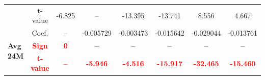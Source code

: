 \documentclass[11pt,english,a4paper,hidelinks]{book}
\begin{document}
\begin{table}[H]
\begin{tabular}{lccccccc}
            & t-value & -6.825    & --        & -13.395   & -13.741   & 8.556     & 4.667     \\
        \cmidrule{1-8}
        \multirow{3}{*}{\textbf{Avg 24M}}
            & Coef.   & --        & -0.005729 & -0.003473 & -0.015642 & -0.029044 & -0.013761 \\
            & \textbf{\textcolor{red}{Sign}}    & \textbf{\textcolor{red}{0}}         & \textbf{\textcolor{red}{–}}         & \textbf{\textcolor{red}{–}}         & \textbf{\textcolor{red}{–}}         & \textbf{\textcolor{red}{–}}         & \textbf{\textcolor{red}{–}}         \\
            & \textbf{\textcolor{red}{t-value}} & \textbf{\textcolor{red}{--}}        & \textbf{\textcolor{red}{-5.946}}    & \textbf{\textcolor{red}{-4.516}}    & \textbf{\textcolor{red}{-15.917}}   & \textbf{\textcolor{red}{-32.465}}   & \textbf{\textcolor{red}{-15.460}}   \\
        \bottomrule
    \end{tabular}
    \label{tab:africa_middle_east_value_consistency}
\end{table}
\end{document}

